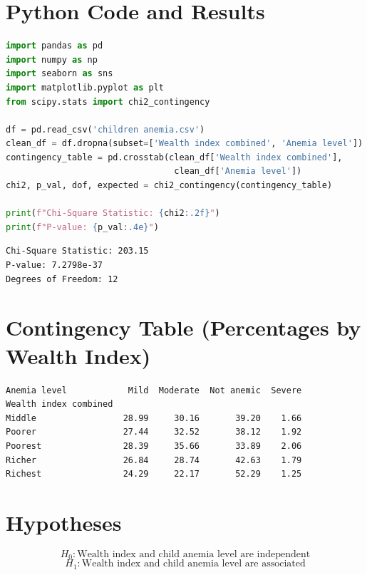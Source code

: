 \documentclass[12pt, a4paper]{article}
\begin{document}
\section*{Python Code and Results}

\begin{lstlisting}[language=Python]
import pandas as pd
import numpy as np
import seaborn as sns
import matplotlib.pyplot as plt
from scipy.stats import chi2_contingency

df = pd.read_csv('children anemia.csv')
clean_df = df.dropna(subset=['Wealth index combined', 'Anemia level'])
contingency_table = pd.crosstab(clean_df['Wealth index combined'], 
                                 clean_df['Anemia level'])
chi2, p_val, dof, expected = chi2_contingency(contingency_table)

print(f"Chi-Square Statistic: {chi2:.2f}")
print(f"P-value: {p_val:.4e}")
\end{lstlisting}

\begin{outputbox}
\begin{verbatim}
Chi-Square Statistic: 203.15
P-value: 7.2798e-37
Degrees of Freedom: 12
\end{verbatim}
\end{outputbox}

\section*{Contingency Table (Percentages by Wealth Index)}
\begin{outputbox}
\begin{verbatim}
Anemia level            Mild  Moderate  Not anemic  Severe
Wealth index combined                                     
Middle                 28.99     30.16       39.20    1.66
Poorer                 27.44     32.52       38.12    1.92
Poorest                28.39     35.66       33.89    2.06
Richer                 26.84     28.74       42.63    1.79
Richest                24.29     22.17       52.29    1.25
\end{verbatim}
\end{outputbox}

\section*{Hypotheses}
\[
H_0: \text{Wealth index and child anemia level are independent}
\]
\[
H_1: \text{Wealth index and child anemia level are associated}
\]
\end{document}
